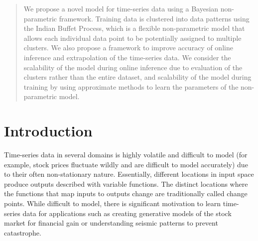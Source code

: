\documentclass{article}
\begin{document}
 


\begin{abstract} 
We propose a novel model for time-series data using a Bayesian non-parametric framework. Training data is clustered into data patterns using the Indian Buffet Process, which is a flexible non-parametric model that allows each individual data point to be potentially assigned to multiple clusters. We also propose a framework to improve accuracy of online inference and extrapolation of the time-series data. We consider the scalability of the model during online inference due to evaluation of the clusters rather than the entire dataset, and scalability of the model during training by using approximate methods to learn the parameters of the non-parametric model.
\end{abstract} 
\vspace{-.25in}

\section{Introduction}

Time-series data in several domains is highly volatile and difficult to model (for example, stock prices fluctuate wildly and are difficult to model accurately) due to their often non-stationary nature. Essentially, different locations in input space produce outputs described with variable functions. The distinct locations where the functions that map inputs to outputs change are traditionally called change points. While difficult to model, there is significant motivation to learn time-series data for applications such as creating generative models of the stock market for financial gain or understanding seismic patterns to prevent catastrophe. 
\end{document}
